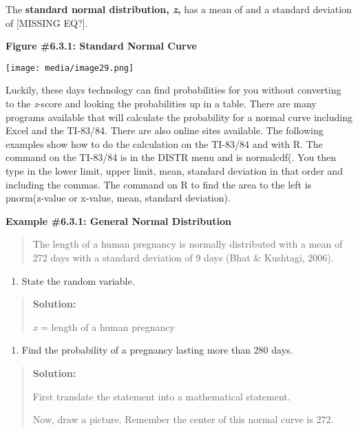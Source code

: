 \documentclass[]{book}
\providecommand{\tightlist}{%
  \setlength{\itemsep}{0pt}\setlength{\parskip}{0pt}}
\begin{document}
The \textbf{standard normal distribution, \emph{z},} has a mean of and a standard deviation of {[}MISSING EQ?{]}.

\textbf{Figure \#6.3.1: Standard Normal Curve}

\texttt{[image: media/image29.png]}

Luckily, these days technology can find probabilities for you without converting to the \emph{z}-score and looking the probabilities up in a table. There are many programs available that will calculate the probability for a normal curve including Excel and the TI-83/84. There are also online sites available. The following examples show how to do the calculation on the TI-83/84 and with R. The command on the TI-83/84 is in the DISTR menu and is normalcdf(. You then type in the lower limit, upper limit, mean, standard deviation in that order and including the commas. The command on R to find the area to the left is pnorm(z-value or x-value, mean, standard deviation).

\textbf{Example \#6.3.1: General Normal Distribution}

\begin{quote}
The length of a human pregnancy is normally distributed with a mean of 272 days with a standard deviation of 9 days (Bhat \& Kushtagi, 2006).
\end{quote}

\begin{enumerate}
\def\labelenumi{\alph{enumi}.}
\tightlist
\item
  State the random variable.
\end{enumerate}

\begin{quote}
\textbf{Solution:}

\emph{x} = length of a human pregnancy
\end{quote}

\begin{enumerate}
\def\labelenumi{\alph{enumi}.}
\setcounter{enumi}{1}
\tightlist
\item
  Find the probability of a pregnancy lasting more than 280 days.
\end{enumerate}

\begin{quote}
\textbf{Solution:}

First translate the statement into a mathematical statement.

Now, draw a picture. Remember the center of this normal curve is 272.
\end{quote}
\end{document}
